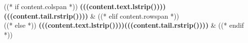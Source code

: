 ((* if content.colspan *))
 \textbf{(((content.text.lstrip())))(((content.tail.rstrip())))} &
((* elif content.rowspan *))
\\
((* else *))
\textbf{(((content.text.lstrip())))(((content.tail.rstrip())))} &
((* endif *))
